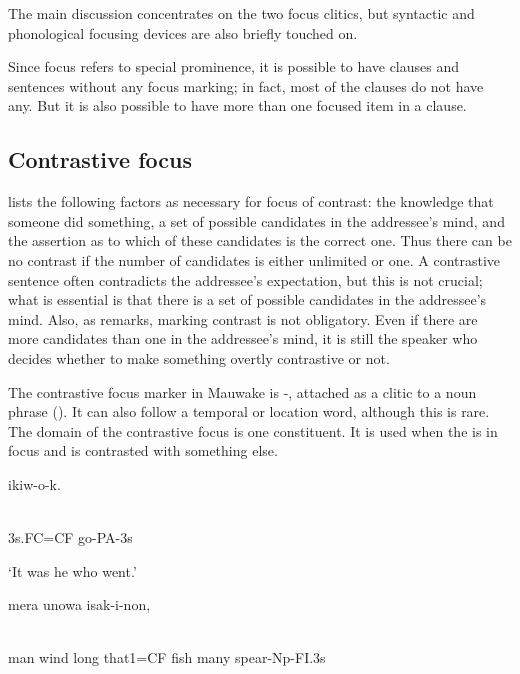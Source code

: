 The main discussion concentrates on the two focus clitics, but syntactic and phonological focusing devices are also briefly touched on.

Since focus refers to special prominence, it is possible to have clauses and sentences without any focus marking; in fact, most of the clauses do not have any. But it is also possible to have more than one focused item in a clause. 

\subsection{Contrastive focus}
\hypertarget{RefHeading23921935131865}{}
\citet{Chafe1976} lists the following factors as necessary for focus of contrast: the knowledge that someone did something, a set of possible candidates in the addressee's mind, and the assertion as to which of these candidates is the correct one. Thus there can be no contrast if the number of candidates is either unlimited or one. A contrastive sentence often contradicts the addressee's expectation, but this is not crucial; what is essential is that there is a set of possible candidates in the addressee's mind. Also, as  \citet[348]{Linde1979} remarks, marking contrast is not obligatory. Even if there are more candidates than one in the addressee's mind, it is still the speaker who decides whether to make something overtly contrastive or not.  

The contrastive focus marker in Mauwake is -, attached as a clitic to a noun phrase (). It can also follow a temporal or location word, although this is rare. The domain of the contrastive focus is one constituent. It is used when the  is in focus and is contrasted with something else. 

\ea%
\label{ex:x1688}
\gll {}  ikiw-o-k. \\
      \\
\glt
\z

3s.FC=CF  go-PA-3s

`It was he who went.'

\ea%
\label{ex:x1689}
\gll {}  mera  unowa  isak-i-non, \\
      \\
\glt
\z

man  wind  long  that1=CF  fish  many  spear-Np-FI.3s

